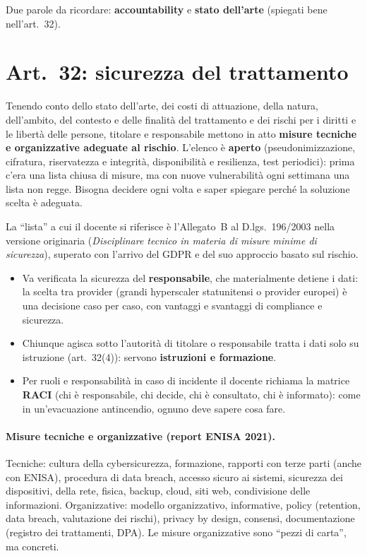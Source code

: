 \begin{esame}
Due parole da ricordare: \textbf{accountability} e \textbf{stato dell'arte} (spiegati bene
nell'art.~32).
\end{esame}

\section{Art.~32: sicurezza del trattamento}
Tenendo conto dello stato dell'arte, dei costi di attuazione, della natura, dell'ambito, del contesto e
delle finalità del trattamento e dei rischi per i diritti e le libertà delle persone, titolare e
responsabile mettono in atto \textbf{misure tecniche e organizzative adeguate al rischio}. L'elenco è
\textbf{aperto} (pseudonimizzazione, cifratura, riservatezza e integrità, disponibilità e resilienza,
test periodici): prima c'era una lista chiusa di misure, ma con nuove vulnerabilità ogni settimana una
lista non regge. Bisogna decidere ogni volta e saper spiegare perché la soluzione scelta è adeguata.

\begin{integrazione}
La ``lista'' a cui il docente si riferisce è l'Allegato~B al D.lgs.~196/2003 nella versione originaria
(\emph{Disciplinare tecnico in materia di misure minime di sicurezza}), superato con l'arrivo del GDPR e
del suo approccio basato sul rischio.
\end{integrazione}

\begin{itemize}
  \item Va verificata la sicurezza del \textbf{responsabile}, che materialmente detiene i dati: la scelta
    tra provider (grandi hyperscaler statunitensi o provider europei) è una decisione caso per caso,
    con vantaggi e svantaggi di compliance e sicurezza.
  \item Chiunque agisca sotto l'autorità di titolare o responsabile tratta i dati solo su istruzione
    (art.~32(4)): servono \textbf{istruzioni e formazione}.
  \item Per ruoli e responsabilità in caso di incidente il docente richiama la matrice \textbf{RACI}
    (chi è responsabile, chi decide, chi è consultato, chi è informato): come in un'evacuazione
    antincendio, ognuno deve sapere cosa fare.
\end{itemize}

\paragraph{Misure tecniche e organizzative (report ENISA 2021).} Tecniche: cultura della
cybersicurezza, formazione, rapporti con terze parti (anche con ENISA), procedura di data breach,
accesso sicuro ai sistemi, sicurezza dei dispositivi, della rete, fisica, backup, cloud, siti web,
condivisione delle informazioni. Organizzative: modello organizzativo, informative, policy (retention,
data breach, valutazione dei rischi), privacy by design, consensi, documentazione (registro dei
trattamenti, DPA). Le misure organizzative sono ``pezzi di carta'', ma concreti.

